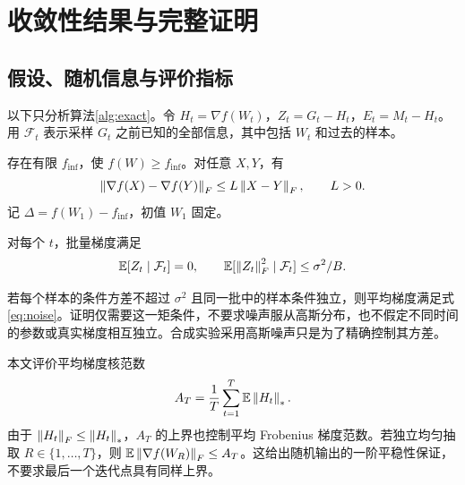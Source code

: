\section{收敛性结果与完整证明}\label{sec:theory}
\subsection{假设、随机信息与评价指标}
以下只分析算法\ref{alg:exact}。令 $H_t=\nabla f(W_t)$，$Z_t=G_t-H_t$，$E_t=M_t-H_t$。用 $\mathcal F_t$ 表示采样 $G_t$ 之前已知的全部信息，其中包括 $W_t$ 和过去的样本。

\begin{assumption}[下界与光滑性]\label{ass:smooth}
存在有限 $f_{\inf}$，使 $f(W)\geq f_{\inf}$。对任意 $X,Y$，有
\begin{equation}\label{eq:smooth}
 \left\lVert\nabla f(X)-\nabla f(Y)\right\rVert_F\leq L\left\lVert X-Y\right\rVert_F,\qquad L>0.
\end{equation}
记 $\Delta=f(W_1)-f_{\inf}$，初值 $W_1$ 固定。
\end{assumption}

\begin{assumption}[条件无偏与方差]\label{ass:noise}
对每个 $t$，批量梯度满足
\begin{equation}\label{eq:noise}
 \mathbb E[Z_t\mid\mathcal F_t]=0,\qquad
 \mathbb E[\left\lVert Z_t\right\rVert_F^2\mid\mathcal F_t]\leq\sigma^2/B.
\end{equation}
\end{assumption}

若每个样本的条件方差不超过 $\sigma^2$ 且同一批中的样本条件独立，则平均梯度满足式\eqref{eq:noise}。证明仅需要这一矩条件，不要求噪声服从高斯分布，也不假定不同时间的参数或真实梯度相互独立。合成实验采用高斯噪声只是为了精确控制其方差。

本文评价平均梯度核范数
\begin{equation}\label{eq:criterion}
 A_T=\frac1T\sum_{t=1}^T\mathbb E\left\lVert H_t\right\rVert_*.
\end{equation}
由于 $\left\lVert H_t\right\rVert_F\leq\left\lVert H_t\right\rVert_*$，$A_T$ 的上界也控制平均 Frobenius 梯度范数。若独立均匀抽取 $R\in\{1,\ldots,T\}$，则 $\mathbb E\left\lVert\nabla f(W_R)\right\rVert_F\leq A_T$。这给出随机输出的一阶平稳性保证，不要求最后一个迭代点具有同样上界。

